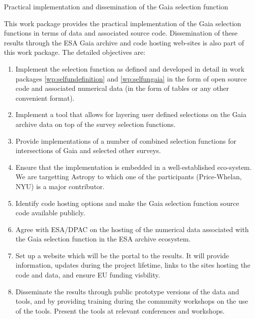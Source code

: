 \begin{workpackage}{Practical implementation and dissemination of the Gaia selection function}
  \label{wp:selfunimplementation}
  \wpend{\duration} %
 
  \makewptable %

  \begin{wpobjectives}
    This work package provides the practical implementation of the Gaia selection functions in terms of data and associated source code. Dissemination of these results through the ESA Gaia archive and code hosting web-sites is also part of this work package. The detailed objectives are:
    \begin{enumerate}
      \item Implement the selection function as defined and developed in detail in work packages \ref{wp:selfundefinition} and \ref{wp:selfungaia} in the form of open source code and associated numerical data (in the form of tables or any other convenient format).
      \item Implement a tool that allows for layering user defined selections on the Gaia archive data on top of the survey selection functions.
      \item Provide implementations of a number of combined selection functions for intersections of Gaia and selected other surveys.
      \item Ensure that the implementation is embedded in a well-established eco-system. We are targetting Astropy to which one of the participants (Price-Whelan, NYU) is a major contributor.
      \item Identify code hosting options and make the Gaia selection function source code available publicly.
      \item Agree with ESA/DPAC on the hosting of the numerical data associated with the Gaia selection function in the ESA archive ecosystem.
      \item Set up a website which will be the portal to the {\acro} results. It will provide information, updates during the project lifetime, links to the sites hosting the code and data, and ensure EU funding visbility.
      \item Disseminate the results through public prototype versions of the {\acro} data and tools, and by providing training during the community workshops on the use of the tools. Present the {\acro} tools at relevant conferences and workshops.
    \end{enumerate}
  \end{wpobjectives}


\end{workpackage}
